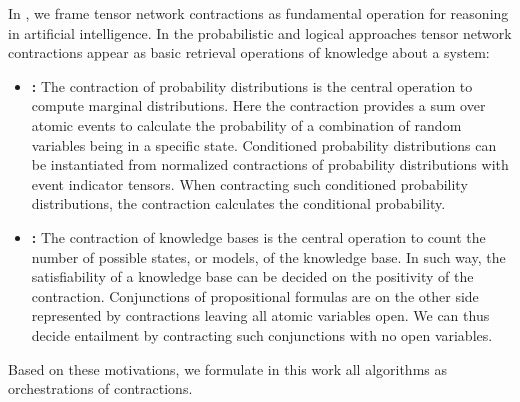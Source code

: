 
In , we frame tensor network contractions as fundamental operation for reasoning in artificial intelligence.
In the probabilistic and logical approaches tensor network contractions appear as basic retrieval operations of knowledge about a system:
\begin{itemize}
    \item \textbf{\ProbabilityTheory{}:}
    The contraction of probability distributions is the central operation to compute marginal distributions.
    Here the contraction provides a sum over atomic events to calculate the probability of a combination of random variables being in a specific state.
    Conditioned probability distributions can be instantiated from normalized contractions of probability distributions with event indicator tensors.
    When contracting such conditioned probability distributions, the contraction calculates the conditional probability.
    \item \textbf{\PropositionalLogic{}:}
    The contraction of knowledge bases is the central operation to count the number of possible states, or models, of the knowledge base.
    In such way, the satisfiability of a knowledge base can be decided on the positivity of the contraction.
    Conjunctions of propositional formulas are on the other side represented by contractions leaving all atomic variables open.
    We can thus decide entailment by contracting such conjunctions with no open variables.
\end{itemize}
Based on these motivations, we formulate in this work all algorithms as orchestrations of contractions.


